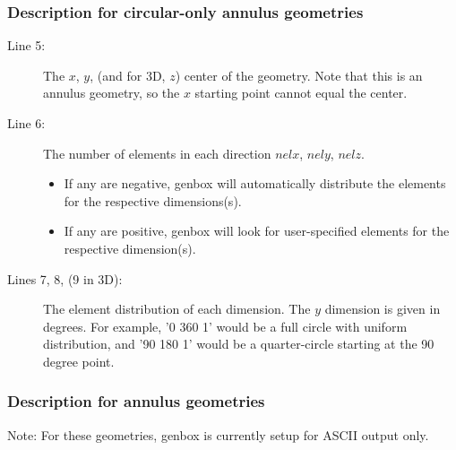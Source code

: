 \subsubsection{Description for circular-only annulus geometries}

\begin{description} 
  
  \item[Line 5:] The \(x\), \(y\), (and for 3D, \(z\)) center of the geometry.
    Note that this is an annulus geometry, so the \(x\) starting point cannot
    equal the center.

  \item[Line 6:] The number of elements in each direction \(nelx\), \(nely\),
    \(nelz\).

    \begin{itemize}

      \item If any are negative, genbox will automatically distribute the
        elements for the respective dimensions(s).

      \item If any are positive, genbox will look for user-specified elements
        for the respective dimension(s).

    \end{itemize}

  \item [Lines 7, 8, (9 in 3D):] The element distribution of each dimension.  The
    \(y\) dimension is given in degrees. For example, '0 360 1' would be a full
    circle with uniform distribution, and '90 180 1' would be a quarter-circle
    starting at the 90 degree point.

\end{description}

\subsubsection{Description for annulus geometries}

Note: For these geometries, genbox is currently setup for ASCII output only.

